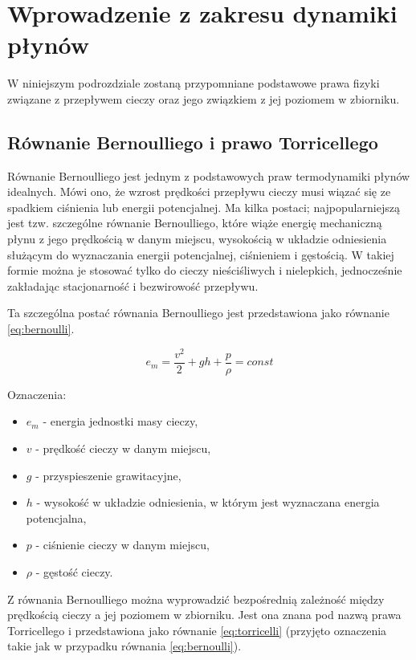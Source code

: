 \section{Wprowadzenie z zakresu dynamiki płynów}
\label{sec:plyny}

W niniejszym podrozdziale zostaną przypomniane podstawowe prawa fizyki związane z przepływem cieczy oraz jego związkiem z jej poziomem w zbiorniku.

\subsection{Równanie Bernoulliego i prawo Torricellego}
\label{sub:plyny-torr}

Równanie Bernoulliego jest jednym z podstawowych praw termodynamiki płynów idealnych. Mówi ono, że wzrost prędkości przepływu cieczy musi wiązać się ze spadkiem ciśnienia lub energii potencjalnej.
Ma kilka postaci; najpopularniejszą jest tzw. szczególne równanie Bernoulliego, które wiąże energię mechaniczną płynu z jego prędkością w danym miejscu, wysokością w układzie odniesienia służącym do wyznaczania energii potencjalnej, ciśnieniem i gęstością.
W takiej formie można je stosować tylko do cieczy nieściśliwych i nielepkich, jednocześnie zakładając stacjonarność i bezwirowość przepływu.

Ta szczególna postać równania Bernoulliego jest przedstawiona jako równanie \ref{eq:bernoulli}.

\begin{equation}\label{eq:bernoulli}
e_{m} = \frac{v^2}{2} + gh + \frac{p}{\rho} = const
\end{equation}

Oznaczenia:
\begin{itemize}
	\item $e_{m}$ - energia jednostki masy cieczy,
	\item $v$ - prędkość cieczy w danym miejscu,
	\item $g$ - przyspieszenie grawitacyjne,
	\item $h$ - wysokość w układzie odniesienia, w którym jest wyznaczana energia potencjalna,
	\item $p$ - ciśnienie cieczy w danym miejscu,
	\item $\rho$ - gęstość cieczy.
\end{itemize}

Z równania Bernoulliego można wyprowadzić bezpośrednią zależność między prędkością cieczy a jej poziomem w zbiorniku. Jest ona znana pod nazwą prawa Torricellego i przedstawiona jako równanie \ref{eq:torricelli} (przyjęto oznaczenia takie jak w przypadku równania \ref{eq:bernoulli}).

